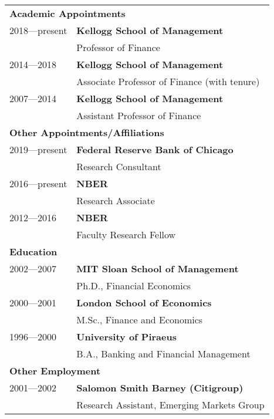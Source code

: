 \documentclass[11pt,letterpaper,serif,overlapped]{res}
\begin{document}
\begin{resume}
\begin{tabular}{ll}\\[1cm]
\multicolumn{2}{l}{\textbf{Academic Appointments}}\\
[0.5cm]
2018---present & \textbf{Kellogg School of Management}\\
& Professor of Finance\\
2014---2018 & \textbf{Kellogg School of Management}\\
& Associate Professor of Finance (with tenure)\\
 2007---2014 & \textbf{Kellogg School of Management}\\
& Assistant Professor of Finance\\
[0.5cm]
\multicolumn{2}{l}{\textbf{Other Appointments/Affiliations}}\\
[0.5cm]
2019---present & \textbf{Federal Reserve Bank of Chicago}\\
& Research Consultant \\[0.1cm]
2016---present & \textbf{NBER  }\\
& Research Associate\\[0.1cm]
2012---2016 & \textbf{NBER }\\
& Faculty Research Fellow\\
[0.5cm]
\multicolumn{2}{l}{\textbf{Education}}\\
[0.5cm]
2002---2007 & \textbf{MIT Sloan School of Management}\\
& Ph.D., Financial Economics\\[0.1cm]
2000---2001 & \textbf{London School of Economics}\\
& M.Sc., Finance and Economics \\[0.1cm]
1996---2000 & \textbf{University of Piraeus} \\
& B.A., Banking and Financial Management\\
[0.5cm]
\multicolumn{2}{l}{\textbf{Other Employment}}\\
[0.5cm]
2001---2002 & \textbf{Salomon Smith Barney (Citigroup)}\\
& Research Assistant, Emerging Markets Group\\
\end{tabular}
\newpage


\end{resume}
\end{document}
